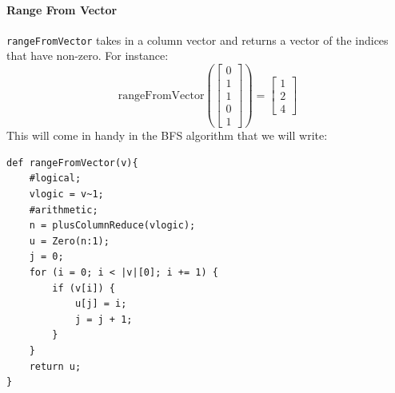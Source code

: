 \paragraph{Range From Vector}
\verb=rangeFromVector= takes in a column vector and returns a vector of the indices that have non-zero.  For instance:
$$\text{rangeFromVector}(\begin{bmatrix}
0 \\ 1 \\ 1 \\ 0 \\ 1
\end{bmatrix})
=
\begin{bmatrix}
1\\2\\4
\end{bmatrix}
$$
This will come in handy in the BFS algorithm that we will write:
\begin{lstlisting}
def rangeFromVector(v){
    #logical;
    vlogic = v~1;
    #arithmetic;
    n = plusColumnReduce(vlogic);
    u = Zero(n:1);
    j = 0;
    for (i = 0; i < |v|[0]; i += 1) {
        if (v[i]) {
            u[j] = i;
            j = j + 1;
        }
    }
    return u;
}
\end{lstlisting}



